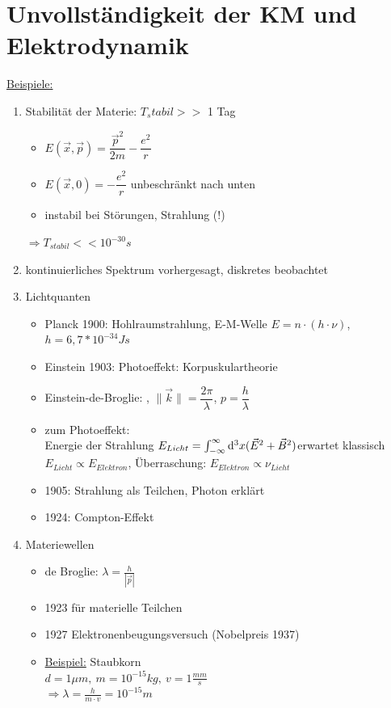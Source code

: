 				\section{Unvollständigkeit der KM und Elektrodynamik}
					\underline{Beispiele:}
					\begin{enumerate} 
						\item Stabilität der Materie: $T_stabil >> $ 1 Tag
						\begin{itemize}
							\item $E(\vec{x},\vec{p})=\dfrac{\vec{p}^2}{2m}-\dfrac{e^2}{r}$
							\item $E(\vec{x}, 0) =- \dfrac {e^2}{r}$ unbeschränkt nach unten
							\item instabil bei Störungen, Strahlung (!)
						\end{itemize}
					      	$\Rightarrow T_{stabil} << 10^{-30} s$
						\item kontinuierliches Spektrum vorhergesagt, diskretes beobachtet
						\item Lichtquanten
						\begin{itemize}
							\item Planck 1900: Hohlraumstrahlung, E-M-Welle $E=n\cdot(h\cdot \nu)$,\\ $h=6,7*10^{-34} Js$
							\item Einstein 1903: Photoeffekt: Korpuskulartheorie
							\item Einstein-de-Broglie:
							, $\|\vec{k}\|=\dfrac{2\pi}{\lambda}$, $p=\dfrac{h}{\lambda}$
							\item zum Photoeffekt: \\ Energie der Strahlung $E_{Licht}=\int_{-\infty}^{\infty} \mathrm{d}^3x (\vec{E}^2+\vec{B}^2)$erwartet klassisch $E_{Licht} \propto E_{Elektron}$, Überraschung: $E_{Elektron} \propto \nu_{Licht}$
							\item 1905: Strahlung als Teilchen, Photon erklärt
							\item 1924: Compton-Effekt
						\end{itemize}
						\item Materiewellen
						\begin{itemize}
							\item de Broglie: $ \lambda = \frac{h}{|\vec{p}|} $
							\item 1923 für materielle Teilchen
							\item 1927 Elektronenbeugungsversuch (Nobelpreis 1937)
							\item \underline{Beispiel:} Staubkorn \\
									$ d = 1 \mu m, \ m = 10^{-15}kg, \ v=1 \frac{mm}{s} $ \\
									$ \Rightarrow \lambda = \frac{h}{m \cdot v} = 10^{-15}m $ 
						\end{itemize}
					\end{enumerate}
					
